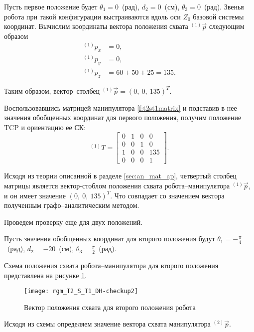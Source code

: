 \documentclass[oneside, final, 14pt]{extarticle}
\begin{document}
Пусть первое положение будет \(\theta_1 = 0\)~(рад), \(d_2 = 0\)~(см), \(\theta_3 = 0\)~(рад).
Звенья робота при такой конфигурации выстраиваются вдоль оси \(Z_0\) базовой системы координат.
Вычислим координаты вектора положения схвата \({}^{(1)} \vec p\) следующим образом
\begin{displaymath}
\begin{aligned}
  {}^{(1)}p_x&=0,\\
  {}^{(1)}p_y&=0,\\
  {}^{(1)}p_z&=60+50+25=135.
\end{aligned}
\end{displaymath}
\par
Таким образом, вектор--столбец \({}^{(1)} \vec p=(0,\:0,\:135)^T\).
\par
Воспользовавшись матрицей манипулятора \ref{f:t2st1matrix} и подставив в нее значения обобщенных координат для первого положения, получим положение TCP и ориентацию ее СК:
\begin{displaymath}
{}^{(1)}T=
\begin{bmatrix}
  0 & 1 & 0 & 0 \\
  0 & 0 & 1 & 0 \\
  1 & 0 & 0 & 135 \\
  0 & 0 & 0 & 1
\end{bmatrix}
.
\end{displaymath}
\par
Исходя из теории описанной в разделе \ref{sec:an_mat_ap}, четвертый столбец матрицы является вектор-стоблом положения схвата робота--манипулятора \({}^{(1)} \vec p\), и он имеет значение \((0,\:0,\:135)^T\).
Что совпадает со значением вектора полученным графо--аналитическим методом.
\par
Проведем проверку еще для двух положений.
\par
Пусть значения обобщенных координат для второго положения будут \(\theta_1 = -\frac{\pi}{4}\)~(рад), \(d_2 = -20\)~(см), \(\theta_3 = \frac{\pi}{2}\)~(рад).
\par
Схема положения схвата робота--манипулятора для второго положения представлена на рисунке \ref{i:rgm_T2_S_T1_DH-checkup2}.
\begin{figure}[h]
  \centering
  \texttt{[image: rgm\_T2\_S\_T1\_DH-checkup2]}
  \caption{Вектор положения схвата для второго положения робота}
  \label{i:rgm_T2_S_T1_DH-checkup2}
\end{figure}
\par
Исходя из схемы определяем значение вектора схвата манипулятора \({}^{(2)} \vec p\).
\end{document}
